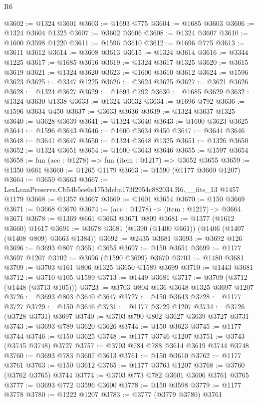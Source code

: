 \begin{lexlean}{R6}
\begin{coremodule}
@3602 := @1324 @3601
@3603 := @1693 @775
@3604 := @1685 @3603
@3606 := @1324 @3604 @1325
@3607 := @3602 @3606
@3608 := @1324 @3607
@3610 := @1600 @3598 @1220
@3611 := @1596 @3610
@3612 := @1696 @775
@3613 := @3611 @3612
@3614 := @3608 @3613
@3615 := @1324 @3614
@3616 := @3344 @1225
@3617 := @1685 @3616
@3619 := @1324 @3617 @1325
@3620 := @3615 @3619
@3621 := @1324 @3620
@3623 := @1600 @3610 @3612
@3624 := @1596 @3623
@3625 := @3347 @1225
@3626 := @3624 @3625
@3627 := @3621 @3626
@3628 := @1324 @3627
@3629 := @1693 @792
@3630 := @1685 @3629
@3632 := @1324 @3630 @1338
@3633 := @1324 @3632
@3634 := @1696 @792
@3636 := @1596 @3634 @450
@3637 := @3633 @3636
@3639 := @1324 @3637 @1325
@3640 := @3628 @3639
@3641 := @1324 @3640
@3643 := @1600 @3623 @3625
@3644 := @1596 @3643
@3646 := @1600 @3634 @450
@3647 := @3644 @3646
@3648 := @3641 @3647
@3650 := @1324 @3648 @1325
@3651 := @1326 @3650
@3652 := @1324 @3651
@3654 := @1600 @3643 @3646
@3655 := @1597 @3654
@3658 := fun (acc : @1278) => fun (item : @1217) => @3652 @3655
@3659 := @1350 @661
@3660 := @1265 @1179
@3663 := @1590 (@1177 @3660 @1207)
@3664 := @3659 @3663
@3667 := LexLeanPreserve.Cb54b5ce6e1753deba173f2954c882034.R6.__fits_13 @1457 @1179
@3668 := @1357 @3667
@3669 := @1601 @3654
@3670 := @150 @3669
@3671 := @3668 @3670
@3674 := (acc : @1278) -> (item : @1217) -> @3664 @3671
@3678 := @1369 @661 @3663 @3671 @809
@3681 := @1377 (@1612 @3660) @1617
@3691 := @3678 @3681 (@1390 (@1400 @661)) (@1406 (@1407 (@1408 @809) @3663 @1384))
@3692 := @2435 @3681
@3693 := @3692 @126
@3696 := @3693 @807 @3651 @3655
@3697 := @150 @3654
@3699 := @1177 @3697 @1207
@3702 := @3696 (@1590 @3699) @3670
@3703 := @1480 @3681
@3709 := @3703 @161 @806 @1325 @3650 @1589 @3699
@3710 := @1443 @3681
@3712 := @3710 @105 @1589
@3713 := @1449 @3681
@3717 := @3709 (@3712 (@1448 (@3713 @105)))
@3723 := @3703 @804 @136 @3648 @1325 @3697 @1207
@3726 := @3693 @803 @3640 @3647
@3727 := @150 @3643
@3728 := @1177 @3727
@3729 := @150 @3646
@3731 := @1177 @3729 @1207
@3734 := @3726 (@3728 @3731) @3697
@3740 := @3703 @790 @802 @3627 @3639 @3727 @3731
@3743 := @3693 @789 @3620 @3626
@3744 := @150 @3623
@3745 := @1177 @3744
@3746 := @150 @3625
@3748 := @1177 @3746 @1207
@3751 := @3743 (@3745 @3748) @3727
@3757 := @3703 @784 @788 @3614 @3619 @3744 @3748
@3760 := @3693 @783 @3607 @3613
@3761 := @150 @3610
@3762 := @1177 @3761
@3763 := @150 @3612
@3765 := @1177 @3763 @1207
@3768 := @3760 (@3762 @3765) @3744
@3774 := @3703 @773 @782 @3601 @3606 @3761 @3765
@3777 := @3693 @772 @3596 @3600
@3778 := @150 @3598
@3779 := @1177 @3778
@3780 := @1222 @1207
@3783 := @3777 (@3779 @3780) @3761

\end{coremodule}
\end{lexlean}
